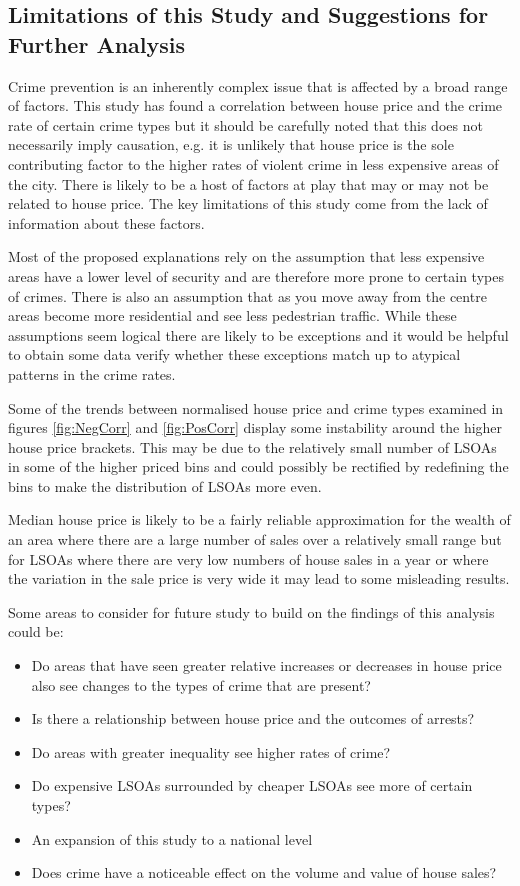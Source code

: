 \documentclass{article}
\begin{document}
\subsection{Limitations of this Study and Suggestions for Further Analysis} \label{Limitations of this Study and Suggestions for Further Analysis}

Crime prevention is an inherently complex issue that is affected by a broad range of factors. This study has found a correlation between house price and the crime rate of certain crime types but it should be carefully noted that this does not necessarily imply causation, e.g. it is unlikely that house price is the sole contributing factor to the higher rates of violent crime in less expensive areas of the city. There is likely to be a host of factors at play that may or may not be related to house price. The key limitations of this study come from the lack of information about these factors. 

Most of the proposed explanations rely on the assumption that less expensive areas have a lower level of security and are therefore more prone to certain types of crimes. There is also an assumption that as you move away from the centre areas become more residential and see less pedestrian traffic. While these assumptions seem logical there are likely to be exceptions and it would be helpful to obtain some data verify whether these exceptions match up to atypical patterns in the crime rates. 

Some of the trends between normalised house price and crime types examined in figures \ref{fig:NegCorr} and \ref{fig:PosCorr} display some instability around the higher house price brackets. This may be due to the relatively small number of LSOAs in some of the higher priced bins and could possibly be rectified by redefining the bins to make the distribution of LSOAs more even.

Median house price is likely to be a fairly reliable approximation for the wealth of an area where there are a large number of sales over a relatively small range but for LSOAs where there are very low numbers of house sales in a year or where the variation in the sale price is very wide it may lead to some misleading results.
\newline

Some areas to consider for future study to build on the findings of this analysis could be:
\begin{itemize}
\item Do areas that have seen greater relative increases or decreases in house price also see changes to the types of crime that are present?
\item Is there a relationship between house price and the outcomes of arrests?
\item Do areas with greater inequality see higher rates of crime?
\item Do expensive LSOAs surrounded by cheaper LSOAs see more of certain types?
\item An expansion of this study to a national level
\item Does crime have a noticeable effect on the volume and value of house sales?
\end{itemize}
\end{document}

